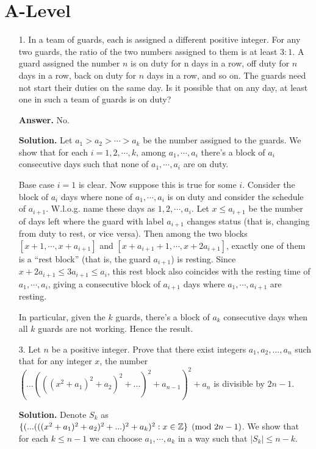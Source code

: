 \documentclass[11pt,a4paper]{article}
\begin{document}
\section*{A-Level}
\begin{enumerate}
	\item[1.] In a team of guards, each is assigned a different positive integer. For any two guards, the ratio of the two numbers assigned to them is at least $3:1$. 
	A guard assigned the number $n$ is on duty for n days in a row, off duty for $n$ days in a row, back on duty for $n$ days in a row, and so on. The guards need not start their duties on the same day. Is it possible that on any day, at least one in such a team of guards is on duty?
	
	\textbf{Answer.} No. 
	
	\textbf{Solution.} Let $a_1>a_2>\cdots > a_k$ be the number assigned to the guards. We show that for each $i=1, 2, \cdots , k$, among $a_1, \cdots , a_i$ there's a block of $a_i$ consecutive days such that none of $a_1, \cdots , a_i$ are on duty. 
	
	Base case $i=1$ is clear. Now suppose this is true for some $i$. Consider the block of $a_i$ days where none of $a_1, \cdots , a_i$ is on duty and consider the schedule of $a_{i+1}$. W.l.o.g. name these days as $1, 2, \cdots , a_i$. Let $x\le a_{i+1}$ be the number of days left where the guard with label $a_{i+1}$ changes status (that is, changing from duty to rest, or vice versa). Then among the two blocks $[x+1, \cdots, x+a_{i+1}]$ and $[x+a_{i+1}+1, \cdots , x+2a_{i+1}]$, exactly one of them is a ``rest block'' (that is, the guard $a_{i+1}$) is resting. 
	Since $x+2a_{i+1}\le 3a_{i+1}\le a_i$, this rest block also coincides with the resting time of $a_1, \cdots , a_i$, giving a consecutive block of $a_{i+1}$ days where $a_1, \cdots , a_{i+1}$ are resting. 
	
	In particular, given the $k$ guards, there's a block of $a_k$ consecutive days when all $k$ guards are not working. Hence the result. 
	
	
	\item[3.] Let $n$ be a positive integer. Prove that there exist integers $a_1, a_2,..., a_n$ such that for any integer $x$, the number $(... (((x^2 + a_1)^2 + a_2)^2 + ...)^2 + a_{n-1})^2 + a_n$ is divisible by $2n - 1$. 
	
	\textbf{Solution.} Denote $S_k$ as $\{(... (((x^2 + a_1)^2 + a_2)^2 + ...)^2 + a_{k})^2: x\in\mathbb{Z}\}\pmod{2n-1}$. We show that for each $k\le n-1$ we can choose $a_1, \cdots , a_k$ in a way such that $|S_k|\le n - k$. 
	

\end{enumerate}
\end{document}
